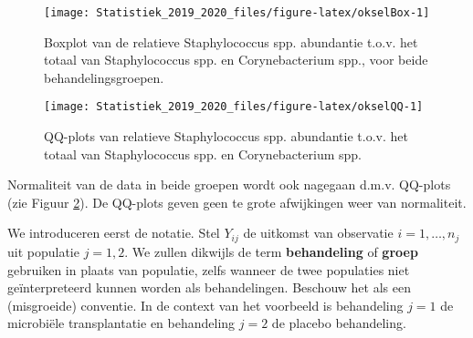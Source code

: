 \documentclass[12pt,dutch,coursenotes]{book}
\newenvironment{Shaded}{\begin{snugshade}}{\end{snugshade}}
\newcommand{\KeywordTok}[1]{\textcolor[rgb]{0.13,0.29,0.53}{\textbf{#1}}}
\newcommand{\DataTypeTok}[1]{\textcolor[rgb]{0.13,0.29,0.53}{#1}}
\newcommand{\DecValTok}[1]{\textcolor[rgb]{0.00,0.00,0.81}{#1}}
\newcommand{\StringTok}[1]{\textcolor[rgb]{0.31,0.60,0.02}{#1}}
\newcommand{\CommentTok}[1]{\textcolor[rgb]{0.56,0.35,0.01}{\textit{#1}}}
\newcommand{\ControlFlowTok}[1]{\textcolor[rgb]{0.13,0.29,0.53}{\textbf{#1}}}
\newcommand{\OperatorTok}[1]{\textcolor[rgb]{0.81,0.36,0.00}{\textbf{#1}}}
\newcommand{\NormalTok}[1]{#1}
\theoremstyle{definition}
\theoremstyle{definition}
\theoremstyle{definition}
\theoremstyle{remark}
\begin{document}
\begin{figure}

{\centering \texttt{[image: Statistiek\_2019\_2020\_files/figure-latex/okselBox-1]} 

}

\caption{Boxplot van de relatieve Staphylococcus spp. abundantie t.o.v. het totaal van Staphylococcus spp. en Corynebacterium spp., voor beide behandelingsgroepen.}\label{fig:okselBox}
\end{figure}

\begin{Shaded}
\end{Shaded}

\begin{figure}

{\centering \texttt{[image: Statistiek\_2019\_2020\_files/figure-latex/okselQQ-1]} 

}

\caption{QQ-plots van relatieve Staphylococcus spp. abundantie t.o.v. het totaal van Staphylococcus spp. en Corynebacterium spp.}\label{fig:okselQQ}
\end{figure}

Normaliteit van de data in beide groepen wordt ook nagegaan d.m.v.
QQ-plots (zie Figuur \ref{fig:okselQQ}). De QQ-plots geven geen te grote
afwijkingen weer van normaliteit.

We introduceren eerst de notatie. Stel \(Y_{ij}\) de uitkomst van
observatie \(i=1,\ldots, n_j\) uit populatie \(j=1,2\). We zullen
dikwijls de term \textbf{behandeling} of \textbf{groep} gebruiken in
plaats van populatie, zelfs wanneer de twee populaties niet
geïnterpreteerd kunnen worden als behandelingen. Beschouw het als een
(misgroeide) conventie. In de context van het voorbeeld is behandeling
\(j=1\) de microbiële transplantatie en behandeling \(j=2\) de placebo
behandeling.
\end{document}
